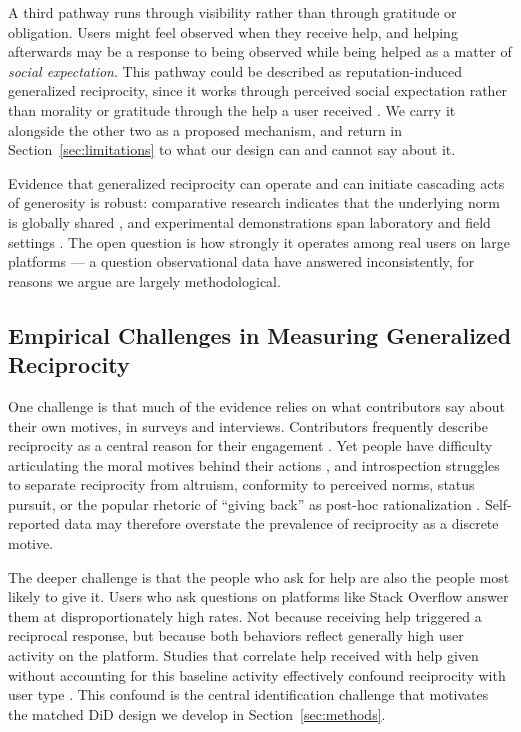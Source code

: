 A third pathway runs through visibility rather than through gratitude or obligation. Users might feel observed when they receive help, and helping afterwards may be a response to being observed while being helped as a matter of \textit{social expectation}. This pathway could be described as reputation-induced generalized reciprocity, since it works through perceived social expectation rather than morality or gratitude through the help a user received \citep{simpson_roots_2018, milinski_reputation_2002}. We carry it alongside the other two as a proposed mechanism, and return in Section~\ref{sec:limitations} to what our design can and cannot say about it.

Evidence that generalized reciprocity can operate and can initiate cascading acts of generosity \citep{fowler_cooperative_2010, boyd_evolution_1989} is robust: comparative research indicates that the underlying norm is globally shared \citep{curry_is_2019}, and experimental demonstrations span laboratory \citep{greiner_indirect_2005, molm_building_2007, stanca_measuring_2009} and field settings \citep{mujcic_indirect_2018, fowler_cooperative_2010}. The open question is how strongly it operates among real users on large platforms --- a question observational data have answered inconsistently, for reasons we argue are largely methodological.

\subsection{Empirical Challenges in Measuring Generalized Reciprocity}

One challenge is that much of the evidence relies on what contributors say about their own motives, in surveys and interviews. Contributors frequently describe reciprocity as a central reason for their engagement \citep{wasko_it_2000, lakhani_how_2003}. Yet people have difficulty articulating the moral motives behind their actions \citep{vaisey_motivation_2009, mcclelland_how_1989}, and introspection struggles to separate reciprocity from altruism, conformity to perceived norms, status pursuit, or the popular rhetoric of ``giving back'' as post-hoc rationalization \citep{batson1991altruism, benabou_incentives_2006}. Self-reported data may therefore overstate the prevalence of reciprocity as a discrete motive.

The deeper challenge is that the people who ask for help are also the people most likely to give it. Users who ask questions on platforms like Stack Overflow answer them at disproportionately high rates. Not because receiving help triggered a reciprocal response, but because both behaviors reflect generally high user activity on the platform. Studies that correlate help received with help given without accounting for this baseline activity effectively confound reciprocity with user type \citep{baker_paying_2014, chen_engaging_2018, joyce_predicting_2006}. This confound is the central identification challenge that motivates the matched DiD design we develop in Section~\ref{sec:methods}.

